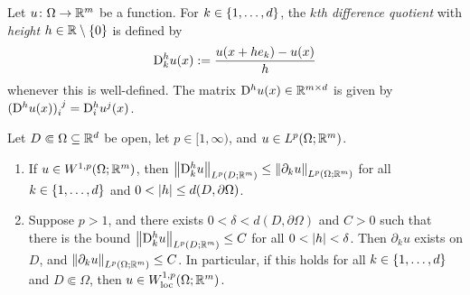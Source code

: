 Let $u \colon \Omega \to \mathbb{R}^m$ be a function. For $k \in \left\{ {1,\dots,d} \right\}$, the $k$\textit{th difference quotient} with \textit{height} $h \in \mathbb{R} \setminus \left\{ {0} \right\}$ is defined by 
\begin{equation}
    \mathrm{D}^h_k u(x) := \frac{u(x+he_k) - u(x)}{h}
\end{equation}
whenever this is well-defined. The matrix $\mathrm{D}^hu(x) \in \mathbb{R}^{m \times d}$ is given by $\tensor{(\D^hu(x))}{_i^j} = \D^h_i u^j(x)$.
\begin{lemma}
    Let $D \Subset \Omega \subseteq \mathbb{R}^d$ be open, let $p \in [1,\infty)$, and $u \in L^p(\Omega;\mathbb{R}^m)$.
    \begin{enumerate}[label={\rm (\arabic*)}]
        \item If $u \in W^{1,p}(\Omega;\mathbb{R}^m)$, then $\left\lVert {\mathrm{D}^h_k u} \right\rVert_{L^p(D;\mathbb{R}^m)} \leq \left\lVert {\partial_k u} \right\rVert_{L^p(\Omega;\mathbb{R}^m)}$ for all $k \in \left\{ {1,\dots,d} \right\}$ and $0 < \left\lvert {h} \right\rvert \leq d(D,\partial \Omega)$.
        
        \item Suppose $p > 1$, and there exists $0 < \delta < d(D,\partial \Omega)$ and $C > 0$ such that there is the bound $\left\lVert {\mathrm{D}^h_k u} \right\rVert_{L^p(D;\mathbb{R}^m)} \leq C$ for all $0 < \left\lvert {h} \right\rvert < \delta$. Then $\partial_k u$ exists on $D$, and $\left\lVert {\partial_k u} \right\rVert_{L^p(\Omega;\mathbb{R}^m)} \leq C$. In particular, if this holds for all $k \in \left\{ {1,\dots,d} \right\}$ and $D \Subset \Omega$, then $u \in W^{1,p}_{\rm loc}(\Omega;\mathbb{R}^m)$.
    \end{enumerate}
\end{lemma}
